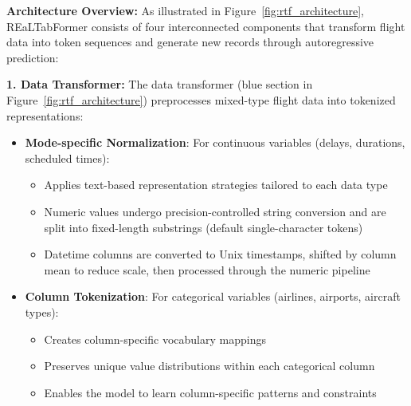 \documentclass[conference]{IEEEtran}
\begin{document}
\textbf{Architecture Overview:} As illustrated in Figure~\ref{fig:rtf_architecture}, REaLTabFormer consists of four interconnected components that transform flight data into token sequences and generate new records through autoregressive prediction:

\textbf{1. Data Transformer:} The data transformer (blue section in Figure~\ref{fig:rtf_architecture}) preprocesses mixed-type flight data into tokenized representations:
\begin{itemize}
    \item \textbf{Mode-specific Normalization}: For continuous variables (delays, durations, scheduled times):
    \begin{itemize}
        \item Applies text-based representation strategies tailored to each data type
        \item Numeric values undergo precision-controlled string conversion and are split into fixed-length substrings (default single-character tokens)
        \item Datetime columns are converted to Unix timestamps, shifted by column mean to reduce scale, then processed through the numeric pipeline
    \end{itemize}
    \item \textbf{Column Tokenization}: For categorical variables (airlines, airports, aircraft types):
    \begin{itemize}
        \item Creates column-specific vocabulary mappings
        \item Preserves unique value distributions within each categorical column
        \item Enables the model to learn column-specific patterns and constraints
    \end{itemize}
\end{itemize}
\end{document}
